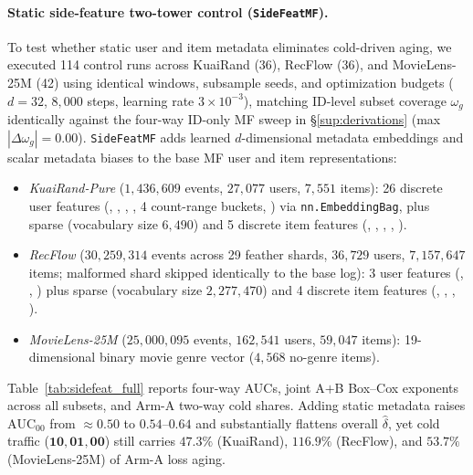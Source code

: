 \documentclass[10pt,letterpaper]{article}
\begin{document}
\paragraph{Static side-feature two-tower control (\texttt{SideFeatMF}).}
To test whether static user and item metadata eliminates cold-driven aging,
we executed 114 control runs across KuaiRand (36), RecFlow (36), and MovieLens-25M
(42) using identical windows, subsample seeds, and optimization budgets
($d = 32$, $8{,}000$ steps, learning rate $3 \times 10^{-3}$), matching ID-level
subset coverage $\omega_g$ identically against the four-way ID-only MF sweep in
\S\ref{sup:derivations} (max $|\Delta\omega_g| = 0.00$).
\texttt{SideFeatMF} adds learned $d$-dimensional metadata embeddings and scalar
metadata biases to the base MF user and item representations:
\begin{sloppypar}
\begin{itemize}
\item \emph{KuaiRand-Pure} ($1{,}436{,}609$ events, $27{,}077$ users, $7{,}551$
      items): 26 discrete user features (,
      , ,
      , 4 count-range buckets, )
      via \texttt{nn.EmbeddingBag}, plus sparse  (vocabulary
      size $6{,}490$) and 5 discrete item features (,
      , , ,
      ).
\item \emph{RecFlow} ($30{,}259{,}314$ events across 29 feather shards,
      $36{,}729$ users, $7{,}157{,}647$ items; malformed shard
       skipped identically to the base log): 3 user
      features (, , ) plus sparse
       (vocabulary size $2{,}277{,}470$) and 4 discrete item
      features (, ,
      , ).
\item \emph{MovieLens-25M} ($25{,}000{,}095$ events, $162{,}541$ users,
      $59{,}047$ items): 19-dimensional binary movie genre vector ($4{,}568$
      no-genre items).
\end{itemize}
\end{sloppypar}

Table~\ref{tab:sidefeat_full} reports four-way AUCs, joint A${+}$B Box--Cox
exponents across all subsets, and Arm-A two-way cold shares. Adding static
metadata raises $\mathrm{AUC}_{00}$ from ${\approx}0.50$ to $0.54$--$0.64$
and substantially flattens overall $\hat\delta$, yet cold traffic
($\mathbf{10}, \mathbf{01}, \mathbf{00}$) still carries $47.3\%$ (KuaiRand),
$116.9\%$ (RecFlow), and $53.7\%$ (MovieLens-25M) of Arm-A loss aging.
\end{document}
